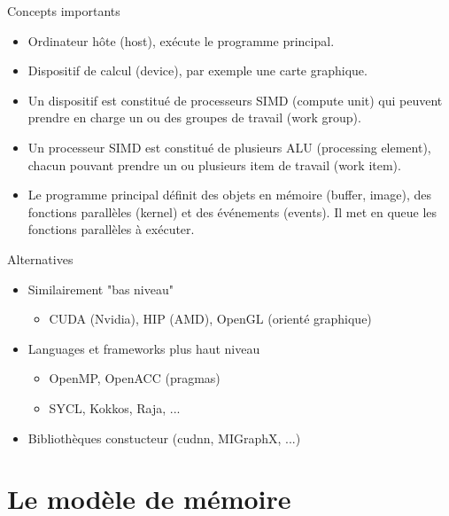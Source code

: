 \documentclass[10pt]{beamer}
\begin{document}
\begin{frame}{Concepts importants}

  \begin{itemize}
    \item Ordinateur hôte (host), exécute le programme principal.

    \item Dispositif de calcul (device), par exemple une carte graphique.

    \item Un dispositif est constitué de processeurs SIMD (compute unit) qui peuvent prendre en charge un ou des groupes de travail (work group).

    \item Un processeur SIMD est constitué de plusieurs ALU (processing element), chacun pouvant prendre un ou plusieurs item de travail (work item).

    \item Le programme principal définit des objets en mémoire (buffer, image), des fonctions parallèles (kernel) et des événements (events). Il met en queue les fonctions parallèles à exécuter.
  \end{itemize}
\end{frame}

\begin{frame}{Alternatives}

  \begin{itemize}
    \item Similairement "bas niveau"
    \begin{itemize}
      \item CUDA (Nvidia), HIP (AMD), OpenGL (orienté graphique)
    \end{itemize}
    \item Languages et frameworks plus haut niveau
    \begin{itemize}
      \item OpenMP, OpenACC (pragmas)
      \item SYCL, Kokkos, Raja, ...
    \end{itemize}
    \item Bibliothèques constucteur (cudnn, MIGraphX, ...)
  \end{itemize}
\end{frame}

\section{Le modèle de mémoire}
\end{document}
